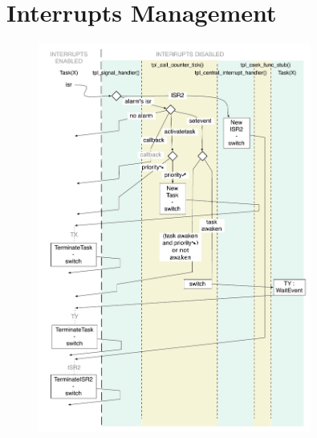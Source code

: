 \documentclass[10pt]{article}
\begin{document}
	
	
	
	
	
\appendix
\section{Interrupts Management} \label{interrupts_management}
	\begin{figure}[htbp] %
   		\centering
		\includegraphics[width=0.8\textwidth]{graphics/Interrupts_Management.pdf}
	\end{figure}
	
 
 
\end{document}

